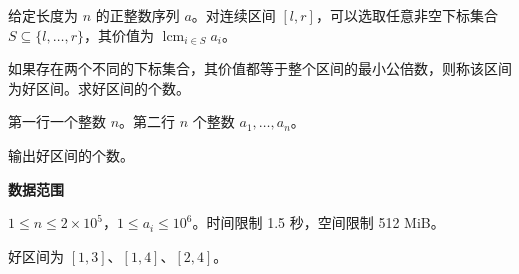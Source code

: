 \Legend
给定长度为 $n$ 的正整数序列 $a$。对连续区间 $[l,r]$，可以选取任意非空下标集合 $S\subseteq\{l,\ldots,r\}$，其价值为 $\operatorname{lcm}_{i\in S}a_i$。

如果存在两个不同的下标集合，其价值都等于整个区间的最小公倍数，则称该区间为好区间。求好区间的个数。

\Input

第一行一个整数 $n$。第二行 $n$ 个整数 $a_1,\ldots,a_n$。

\Output

输出好区间的个数。

\textbf{数据范围}

$1\le n\le 2\times10^5$，$1\le a_i\le 10^6$。时间限制 1.5 秒，空间限制 512 MiB。

\Examples

\begin{example}
\end{example}

好区间为 $[1,3]$、$[1,4]$、$[2,4]$。
